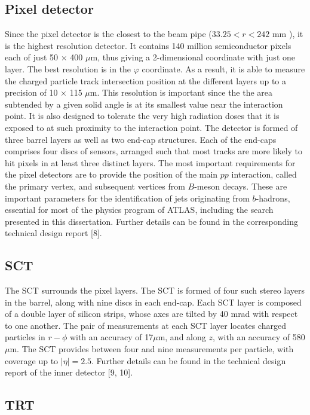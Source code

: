 \subsection*{Pixel detector}
Since the pixel detector is the closest to the beam pipe ($33.25 < r <242$ mm ), it is
the highest resolution detector. It contains 140 million semiconductor pixels each of just
50 $\times$ 400 $\mu$m, 
thus giving a 2-dimensional coordinate with just one layer. The best resolution is in the $\varphi$ coordinate. 
As a result, it is able to measure the charged particle track intersection 
position at the different layers  up
to a precision of 10 $\times$ 115 $\mu$m.
This resolution is important since the 
the area subtended by a given solid angle is at its smallest value near the interaction point.
 It is also designed to tolerate the very high radiation
doses that it is exposed to at such proximity to the interaction point. The detector is
formed of three barrel layers as well as two end-cap structures. Each of the end-caps
comprises four discs of sensors, arranged such that most tracks are more likely to hit pixels in at
least three distinct layers.
The most important requirements for the pixel detectors are to provide the position of the main $pp$
interaction, called the primary vertex, and subsequent vertices from 
$B$-meson decays. These are important parameters for the identification of jets originating from $b$-hadrons,
essential for most of the physics program of ATLAS, including the search presented in this dissertation. 
 Further details can be found in the corresponding technical design report [8].


\subsection*{SCT}

The SCT surrounds the pixel layers.
The SCT is formed of four such stereo layers in the barrel,
along with nine discs in each end-cap. 
Each SCT layer is composed of a double layer of silicon
strips, whose axes are tilted by 40 mrad with respect to one another. The pair of measurements at
each SCT layer locates charged particles in $r - \phi$ with an accuracy of 17$\mu$m, 
and along $z$, with an accuracy of 580 $\mu$m.
The SCT provides between four and nine measurements per particle, with
coverage up to $|\eta|=2.5$.
Further details can be found in the technical design report of the inner
detector [9, 10].


\subsection*{TRT}

